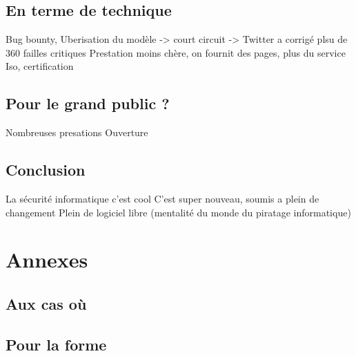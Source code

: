 \documentclass[a4paper]{memoir}
\begin{document}
\chapter{En terme de technique}

Bug bounty, Uberisation du modèle -> court circuit -> Twitter a corrigé plsu de 360 failles critiques 
Prestation moins chère, on fournit des pages, plus du service
Iso, certification

\chapter{Pour le grand public ?}

Nombreuses presations
Ouverture



\chapter*{Conclusion}

La sécurité informatique c'est cool
C'est super nouveau, soumis a plein de changement
Plein de logiciel libre (mentalité du monde du piratage informatique)


\part*{Annexes}
\appendix

\chapter{Aux cas où}

\chapter{Pour la forme}


\backmatter%

\nocite{*}



\printindex
\end{document}
